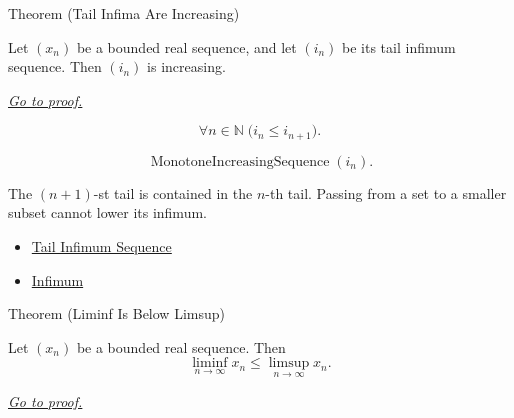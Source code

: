 
\begin{theorembox}{Theorem (Tail Infima Are Increasing)}
\begin{theorem}
\label{thm:tail-infima-are-increasing}
Let $(x_n)$ be a bounded real sequence, and let $(i_n)$ be its tail
infimum sequence. Then $(i_n)$ is increasing.

\smallskip
\noindent
\hyperref[prf:tail-infima-are-increasing]{\textit{Go to proof.}}
\end{theorem}
\end{theorembox}

\begin{remark*}
\[
\forall n\in\mathbb{N}\;\bigl(i_n\le i_{n+1}\bigr).
\]
\end{remark*}

\begin{remark*}
\[
\operatorname{MonotoneIncreasingSequence}(i_n).
\]
\end{remark*}

\begin{remark*}[Interpretation]
The $(n+1)$-st tail is contained in the $n$-th tail. Passing from a set to a
smaller subset cannot lower its infimum.
\end{remark*}

\begin{remark*}[Dependencies]\hfill
\begin{itemize}
  \item \hyperref[def:tail-infimum-sequence]{Tail Infimum Sequence}
  \item \hyperref[def:infimum]{Infimum}
\end{itemize}
\end{remark*}


\begin{theorembox}{Theorem (Liminf Is Below Limsup)}
\begin{theorem}
\label{thm:liminf-below-limsup}
Let $(x_n)$ be a bounded real sequence. Then
\[
  \liminf_{n\to\infty}x_n\le \limsup_{n\to\infty}x_n.
\]

\smallskip
\noindent
\hyperref[prf:liminf-below-limsup]{\textit{Go to proof.}}
\end{theorem}
\end{theorembox}

